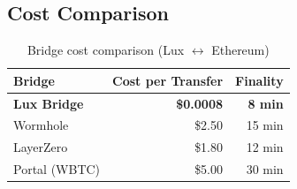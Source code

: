 \subsection{Cost Comparison}

\begin{table}[h]
\centering
\begin{tabular}{lrr}
\toprule
Bridge & Cost per Transfer & Finality \\
\midrule
\textbf{Lux Bridge} & \textbf{\$0.0008} & \textbf{8 min} \\
Wormhole & \$2.50 & 15 min \\
LayerZero & \$1.80 & 12 min \\
Portal (WBTC) & \$5.00 & 30 min \\
\bottomrule
\end{tabular}
\caption{Bridge cost comparison (Lux $\leftrightarrow$ Ethereum)}
\end{table}

